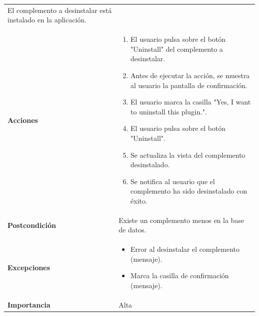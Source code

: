 \documentclass[
]{article}
\providecommand{\tightlist}{%
  \setlength{\itemsep}{0pt}\setlength{\parskip}{0pt}}
\begin{document}
\begin{longtable}[]{@{}ll@{}}
\begin{minipage}[t]{0.72\columnwidth}
El complemento a desinstalar está instalado en la aplicación.\strut
\end{minipage}\tabularnewline
\begin{minipage}[t]{0.22\columnwidth}\raggedright
\textbf{Acciones}\strut
\end{minipage} & \begin{minipage}[t]{0.72\columnwidth}\raggedright
\begin{enumerate}
\def\labelenumi{\arabic{enumi}.}
\tightlist
\item
  El usuario pulsa sobre el botón "Uninstall" del complemento a
  desinstalar.
\item
  Antes de ejecutar la acción, se muestra al usuario la pantalla de
  confirmación.
\item
  El usuario marca la casilla "Yes, I want to uninstall this plugin.".
\item
  El usuario pulsa sobre el botón "Uninstall".
\item
  Se actualiza la vista del complemento desinstalado.
\item
  Se notifica al usuario que el complemento ha sido desinstalado con
  éxito.
\end{enumerate}\strut
\end{minipage}\tabularnewline
\begin{minipage}[t]{0.22\columnwidth}\raggedright
\textbf{Postcondición}\strut
\end{minipage} & \begin{minipage}[t]{0.72\columnwidth}\raggedright
Existe un complemento menos en la base de datos.\strut
\end{minipage}\tabularnewline
\begin{minipage}[t]{0.22\columnwidth}\raggedright
\textbf{Excepciones}\strut
\end{minipage} & \begin{minipage}[t]{0.72\columnwidth}\raggedright
\begin{itemize}
\tightlist
\item
  Error al desinstalar el complemento (mensaje).
\item
  Marca la casilla de confirmación (mensaje).
\end{itemize}\strut
\end{minipage}\tabularnewline
\begin{minipage}[t]{0.22\columnwidth}\raggedright
\textbf{Importancia}\strut
\end{minipage} & \begin{minipage}[t]{0.72\columnwidth}\raggedright
Alta\strut
\end{minipage}\tabularnewline
\bottomrule
\end{longtable}
\end{document}
